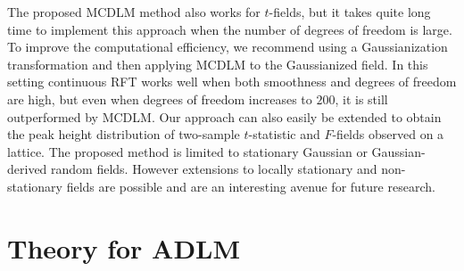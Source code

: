 \documentclass{article}
\newcommand{\sdcom}[1]{\textit{\color{red} [SD: #1]}}
\newcommand{\nt}[1]{\textit{\color{red} #1}}
\begin{document}

The proposed MCDLM method also works for $t$-fields, but it takes quite long time to implement this approach when the number of degrees of freedom is large. To improve the computational efficiency, we recommend using a Gaussianization transformation and then applying MCDLM to the Gaussianized field. In this setting continuous RFT works well when both smoothness and degrees of freedom are high, but even when degrees of freedom increases to $200$, it is still outperformed by MCDLM. Our approach can also easily be extended to obtain the peak height distribution of two-sample $t$-statistic and $F$-fields observed on a lattice. The proposed method is limited to stationary Gaussian or Gaussian-derived random fields. However extensions to locally stationary and non-stationary fields are possible and are an interesting avenue for future research.

\newpage



\newpage
\appendix
\label{sec:headings}

\section{Theory for ADLM}
\label{appendix.a}
\end{document}
